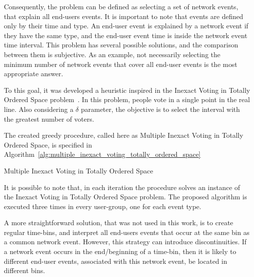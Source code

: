 Consequently, the problem can be defined as selecting a set of network events,
that explain all end-users events. It is important to note that events are
defined only by their time and type.
An end-user event is explained by a network event if they have the same type,
and the end-user event time is inside the network event time interval.
This problem has several possible solutions, and the comparison between
them is subjective. As an example, not
necessarily selecting the minimum number of network events that cover all
end-user events is the most appropriate answer.

To this goal, it was developed a heuristic inspired in the Inexact Voting in
Totally
Ordered Space problem~\cite{voting_algorithms}. In this problem, people
vote in a single point in the real line. Also considering a $\delta$
parameter, the objective is to
select the interval with the greatest number of voters.

The created greedy procedure, called here as Multiple Inexact Voting in Totally
Ordered Space, is specified in
Algorithm~\ref{alg:multiple_inexact_voting_totally_ordered_space}

\begin{algorithm}[H]
\caption{Multiple Inexact Voting in Totally Ordered Space}
\label{alg:multiple_inexact_voting_totally_ordered_space}
    \begin{algorithmic}[1]
        \EndWhile{}
    \end{algorithmic}
\end{algorithm}

It is possible to note that, in each iteration the procedure solves an instance
of the Inexact Voting in Totally Ordered Space problem.
The proposed algorithm is executed three times in every user-group,
one for each event type.

A more straightforward solution, that was not used in this work, is to create
regular time-bins, and interpret all end-users events that occur at the same
bin as a common network event.
However, this strategy can introduce
discontinuities. If a network event occurs in the end/beginning of a time-bin,
then it is likely to different end-user events, associated with this
network event, be located in different bins.

